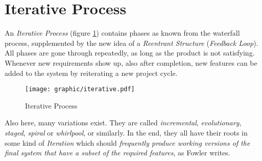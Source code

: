 %
%
%
%
%
%
%

\section{Iterative Process}
\label{iterative_process_heading}

An \emph{Iterative Process} (figure \ref{iterative_figure}) contains phases
as known from the waterfall process, supplemented by the new idea of a
\emph{Reentrant Structure} (\emph{Feedback Loop}). All phases are gone through
repeatedly, as long as the product is not satisfying. Whenever new requirements
show up, also after completion, new features can be added to the system by
reiterating a new project cycle.

\begin{figure}[ht]
    \begin{center}
        \texttt{[image: graphic/iterative.pdf]}
        \caption{Iterative Process}
        \label{iterative_figure}
    \end{center}
\end{figure}

Also here, many variations exist. They are called \emph{incremental},
\emph{evolutionary}, \emph{staged}, \emph{spiral} or \emph{whirlpool}, or
similarly. In the end, they all have their roots in some kind of
\emph{Iteration} which should \textit{frequently produce working versions of
the final system that have a subset of the required features}, as Fowler
\cite{fowlernewmethodology} writes.

